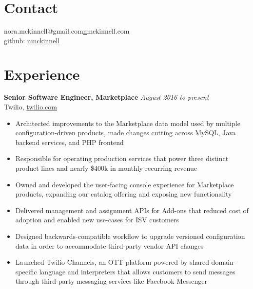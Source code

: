 \documentclass[margin,line]{resume}
\begin{document}
\begin{resume}
\section{\mysidestyle Contact}

nora.mckinnell@gmail.com\hfill \href{http://nmckinnell.com}nmckinnell.com\vspace{0mm}\\\vspace{0mm}%
\hfill github: \href{https://github.com/nmckinnell}{nmckinnell}\vspace{0mm}\\\vspace{1mm}%
\section{\mysidestyle Experience}

\textbf{Senior Software Engineer, Marketplace} \hfill \textsl{August 2016 to present}\vspace{0mm}\\%
Twilio, \href{http://twilio.com}{twilio.com}\vspace{0mm}\\\vspace{-2mm}%
\begin{itemize}
\item Architected improvements to the Marketplace data model used by multiple configuration-driven products, made changes cutting across MySQL, Java backend services, and PHP frontend
\item Responsible for operating production services that power three distinct product lines and nearly \$400k in monthly recurring revenue
\item Owned and developed the user-facing console experience for Marketplace products, expanding our catalog offering and exposing new functionality
\item Delivered management and assignment APIs for Add-ons that reduced cost of adoption and enabled new use-cases for ISV customers
\item Designed backwards-compatible workflow to upgrade versioned configuration data in order to accommodate third-party vendor API changes
\item Launched Twilio Channels, an OTT platform powered by shared domain-specific language and interpreters that allows customers to send messages through third-party messaging services like Facebook Messenger
\end{itemize}


\end{resume}
\end{document}
